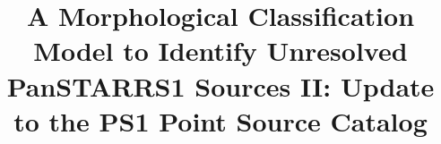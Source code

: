 \documentclass[twocolumn]{aastex63}
\begin{document}
\title{A Morphological Classification Model to Identify Unresolved PanSTARRS1 Sources II: Update to the PS1 Point Source Catalog}


\end{document}
